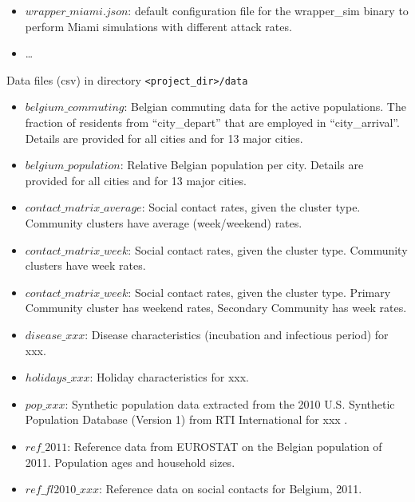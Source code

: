 \begin{compactitem}
\begin{itemize}
		\item $wrapper\_miami.json$: default configuration file for the wrapper\_sim binary to perform Miami simulations with different attack rates.
        \item \ldots
        \end{itemize}
    \item Data files (csv)
      	in directory \texttt{<project\_dir>/data}
      	\begin{itemize}
        \item $belgium\_commuting$: Belgian commuting data for the active populations. The fraction of residents from ``city\_depart'' that are employed in ``city\_arrival''. Details are provided for all cities and for 13 major cities.
		\item $belgium\_population$: Relative Belgian population per city. Details are provided for all cities and for 13 major cities.
		\item $contact\_matrix\_average$: Social contact rates, given the cluster type. Community clusters have average (week/weekend) rates.
		\item $contact\_matrix\_week$: Social contact rates, given the cluster type. Community clusters have week rates.
		\item $contact\_matrix\_week$: Social contact rates, given the cluster type. Primary Community cluster has weekend rates, Secondary Community has week rates.
		\item $disease\_xxx$: Disease characteristics (incubation and infectious period) for xxx.
		\item $holidays\_xxx$: Holiday characteristics for xxx.
		\item $pop\_xxx$: Synthetic population data extracted from the 2010 U.S. Synthetic Population Database (Version 1) from RTI International for xxx \cite{wheaton2014a,wheaton2014b}.
		\item $ref\_2011$: Reference data from EUROSTAT on the Belgian population of 2011. Population ages and household sizes.
		\item $ref\_fl2010\_xxx$: Reference data on social contacts for Belgium, 2011.


\end{itemize}
\end{compactitem}
